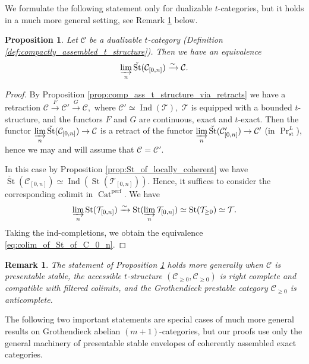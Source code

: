 \documentclass[11pt,leqno]{amsart}
\newtheorem{prop}[theo]{Proposition}
\newtheorem{remark}[theo]{Remark}
\numberwithin{equation}{section}
\newcommand{\indlim}[1][]{\mathop{\varinjlim}\limits_{#1}}
\newcommand{\xto}{\xrightarrow}
\newcommand{\Cat}{\operatorname{Cat}}
\newcommand{\St}{\operatorname{St}}
\newcommand{\st}{\operatorname{st}}
\newcommand{\cC}{{\mathcal C}}
\newcommand{\cT}{{\mathcal T}}
\newcommand{\perf}{\operatorname{perf}}
\newcommand{\Ind}{\operatorname{Ind}}
\begin{document}
We formulate the following statement only for dualizable $t$-categories, but it holds in a much more general setting, see Remark \ref{rem:colim_of_St_of_C_0_n_for_presentable} below.

\begin{prop}\label{prop:colimit_of_St_of_C_0_n}
Let $\cC$ be a dualizable $t$-category (Definition \ref{def:compactly_assembled_t_structure}). Then we have an equivalence
\begin{equation}\label{eq:colim_of_St_of_C_0_n}
\indlim[n]\check{\St}(\cC_{[0,n]})\xto{\sim}\cC.
\end{equation}
\end{prop}

\begin{proof}
By Proposition \ref{prop:comp_ass_t_structure_via_retracts} we have a retraction $\cC\xto{F}\cC'\xto{G}\cC,$ where $\cC'\simeq\Ind(\cT),$ $\cT$ is equipped with a bounded $t$-structure, and the functors $F$ and $G$ are continuous, exact and $t$-exact. Then the functor $\indlim[n]\check{\St}(\cC_{[0,n]})\to\cC$ is a retract of the functor $\indlim[n]\check{\St}(\cC'_{[0,n]})\to\cC'$ (in $\Pr^L_{\st}$), hence we may and will assume that $\cC=\cC'.$

In this case by Proposition \ref{prop:St_of_locally_coherent} we have $\check{\St}(\cC_{[0,n]})\simeq\Ind(\St(\cT_{[0,n]})).$ Hence, it suffices to consider the corresponding colimit in $\Cat^{\perf}.$ We have
\begin{equation*}
\indlim[n]\St(\cT_{[0,n]})\xto{\sim}\St(\indlim[n]\cT_{[0,n]})\simeq \St(\cT_{\geq 0})\simeq\cT.
\end{equation*}
Taking the ind-completions, we obtain the equivalence \eqref{eq:colim_of_St_of_C_0_n}.
\end{proof}

\begin{remark}\label{rem:colim_of_St_of_C_0_n_for_presentable}
The statement of Proposition \ref{prop:colimit_of_St_of_C_0_n} holds more generally when $\cC$ is presentable stable, the accessible $t$-structure $(\cC_{\geq 0},\cC_{\geq 0})$ is right complete and compatible with filtered colimits, and the Grothendieck prestable category $\cC_{\geq 0}$ is anticomplete.
\end{remark}  

The following two important statements are special cases of much more general results on Grothendieck abelian $(m+1)$-categories, but our proofs use only the general machinery of presentable stable envelopes of coherently assembled exact categories.
\end{document}
